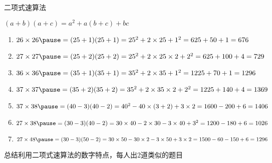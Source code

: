 \documentclass[aspectratio=169]{ctexbeamer} %
\date{\today}
\begin{document}
\begin{frame}[t]{二项式速算法}
\begin{spacing}{1.2}
\normalsize
$(a+b)(a+c)=a^2 + a(b+c) +bc$
\begin{enumerate}[label={\arabic*.}]
\item $26 \times 26 \pause = (25+1)(25+1) = 25^2 + 2 \times 25 + 1^2 = 625 + 50 + 1 = 676$
\item $27 \times 27 \pause = (25+2)(25+2) = 25^2 + 2 \times 25 \times 2 + 2^2 = 625 + 100 + 4 = 729$
\item $36 \times 36 \pause = (35+1)(35+1) = 35^2 + 2 \times 35 + 1^2 = 1225 + 70 + 1 = 1296$
\item $37 \times 37 \pause = (35+2)(35+2) = 35^2 + 2 \times 35 \times 2 + 2^2 = 1225 + 140 + 4 = 1369$
\item $37 \times 38 \pause = (40-3)(40-2) = 40^2 - 40 \times (3 + 2) + 3 \times 2 = 1600 - 200 + 6 = 1406$
\item $27 \times 38 \pause = (30-3)(40-2) = 30 \times 40 - 2 \times 30 - 3 \times 40 + 3^2 = 1200 - 180 + 6 = 1026$
\item $27 \times 48 \pause = (30-3)(50-2) = 30 \times 50 - 30 \times 2 - 3 \times 50 + 3 \times 2 = 1500 - 60 - 150 + 6 = 1296$

\end{enumerate}
\alert{总结利用二项式速算法的数字特点，每人出2道类似的题目} \\
\end{spacing}
\end{frame}
\end{document}
